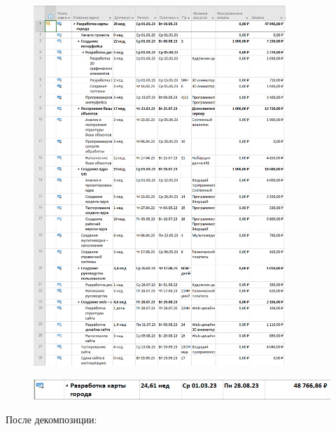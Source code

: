 \begin{figure}[H]
	\begin{center}
		\includegraphics[width=0.85\textwidth]{imgs/task_3_1.png}
	\end{center}
\end{figure}

\begin{figure}[H]
	\begin{center}
		\includegraphics[width=\textwidth]{imgs/task_3_3.png}
	\end{center}
\end{figure}

После декомпозиции:

